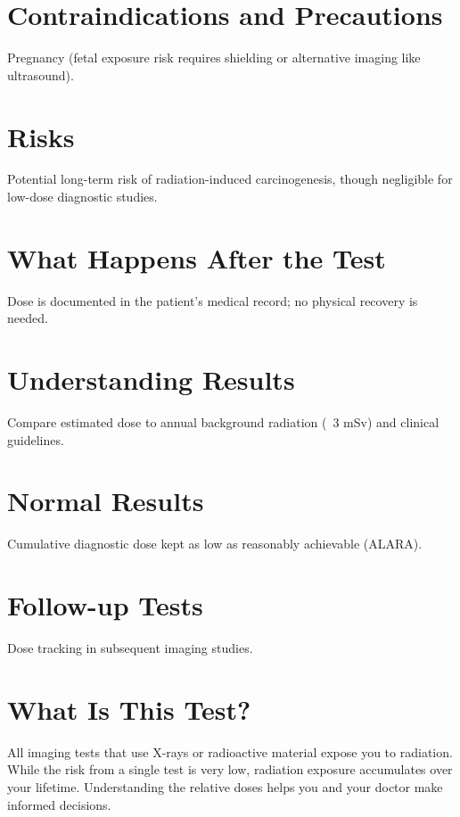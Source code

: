 \section*{Contraindications and Precautions}
Pregnancy (fetal exposure risk requires shielding or alternative imaging like ultrasound).

\section*{Risks}
Potential long-term risk of radiation-induced carcinogenesis, though negligible for low-dose diagnostic studies.

\section*{What Happens After the Test}
Dose is documented in the patient's medical record; no physical recovery is needed.

\section*{Understanding Results}
Compare estimated dose to annual background radiation (~3 mSv) and clinical guidelines.

\section*{Normal Results}
Cumulative diagnostic dose kept as low as reasonably achievable (ALARA).

\section*{Follow-up Tests}
Dose tracking in subsequent imaging studies.

\section*{What Is This Test?}
All imaging tests that use X-rays or radioactive material expose you to radiation. While the risk from a single test is very low, radiation exposure accumulates over your lifetime. Understanding the relative doses helps you and your doctor make informed decisions.

